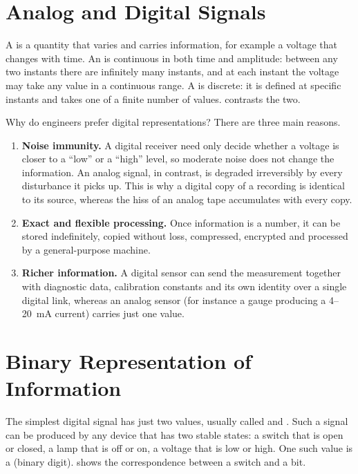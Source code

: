 \section{Analog and Digital Signals}\label{sec:analog-digital}
A  is a quantity that varies and carries information, for example a voltage that changes with time. An  is continuous in both time and amplitude: between any two instants there are infinitely many instants, and at each instant the voltage may take any value in a continuous range. A  is discrete: it is defined at specific instants and takes one of a finite number of values.  contrasts the two.


Why do engineers prefer digital representations? There are three main reasons.
\begin{enumerate}
  \item \textbf{Noise immunity.} A digital receiver need only decide whether a voltage is closer to a ``low'' or a ``high'' level, so moderate noise does not change the information. An analog signal, in contrast, is degraded irreversibly by every disturbance it picks up. This is why a digital copy of a recording is identical to its source, whereas the hiss of an analog tape accumulates with every copy.
  \item \textbf{Exact and flexible processing.} Once information is a number, it can be stored indefinitely, copied without loss, compressed, encrypted and processed by a general-purpose machine.
  \item \textbf{Richer information.} A digital sensor can send the measurement together with diagnostic data, calibration constants and its own identity over a single digital link, whereas an analog sensor (for instance a gauge producing a 4--20~mA current) carries just one value.
\end{enumerate}

\section{Binary Representation of Information}
The simplest digital signal has just two values, usually called  and . Such a signal can be produced by any device that has two stable states: a switch that is open or closed, a lamp that is off or on, a voltage that is low or high. One such value is a  (binary digit).  shows the correspondence between a switch and a bit.

